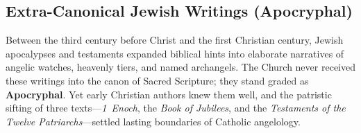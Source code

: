 \subsection{Extra-Canonical Jewish Writings (Apocryphal)}
\label{subsec:apocrypha}

Between the third century before Christ and the first Christian century, Jewish apocalypses and testaments expanded biblical hints into elaborate narratives of angelic watches, heavenly tiers, and named archangels. The Church never received these writings into the canon of Sacred Scripture; they stand graded as \textbf{Apocryphal}. Yet early Christian authors knew them well, and the patristic sifting of three texts---\emph{1~Enoch}, the \emph{Book of Jubilees}, and the \emph{Testaments of the Twelve Patriarchs}---settled lasting boundaries of Catholic angelology.

